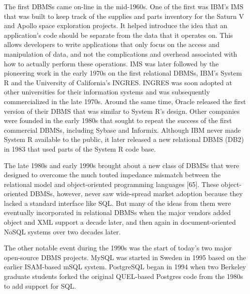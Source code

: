 \documentclass[a4paper,12pt,notitlepage,twoside,openright]{article}
\begin{document}
The first DBMSs came on-line in the mid-1960s. One of the first was
IBM's IMS that was built to keep track of the supplies and parts
inventory for the Saturn V and Apollo space exploration projects. It
helped introduce the idea that an application's code should be separate
from the data that it operates on. This allows developers to write
applications that only focus on the access and manipulation of data, and
not the complications and overhead associated with how to actually
perform these operations. IMS was later followed by the pioneering work
in the early 1970s on the first relational DBMSs, IBM's System R and the
University of California's INGRES. INGRES was soon adopted at other
universities for their information systems and was subsequently
commercialized in the late 1970s. Around the same time, Oracle released
the first version of their DBMS that was similar to System R's design.
Other companies were founded in the early 1980s that sought to repeat
the success of the first commercial DBMSs, including Sybase and
Informix. Although IBM never made System R available to the public, it
later released a new relational DBMS (DB2) in 1983 that used parts of
the System R code base.

The late 1980s and early 1990s brought about a new class of DBMSs that
were designed to overcome the much touted impedance mismatch between the
relational model and object-oriented programming languages {[}65{]}.
These object-oriented DBMSs, however, never saw wide-spread market
adoption because they lacked a standard interface like SQL. But many of
the ideas from them were eventually incorporated in relational DBMSs
when the major vendors added object and XML support a decade later, and
then again in document-oriented NoSQL systems over two decades later.

The other notable event during the 1990s was the start of today's two
major open-source DBMS projects. MySQL was started in Sweden in 1995
based on the earlier ISAM-based mSQL system. PostgreSQL began in 1994
when two Berkeley graduate students forked the original QUEL-based
Postgres code from the 1980s to add support for SQL.
\end{document}
